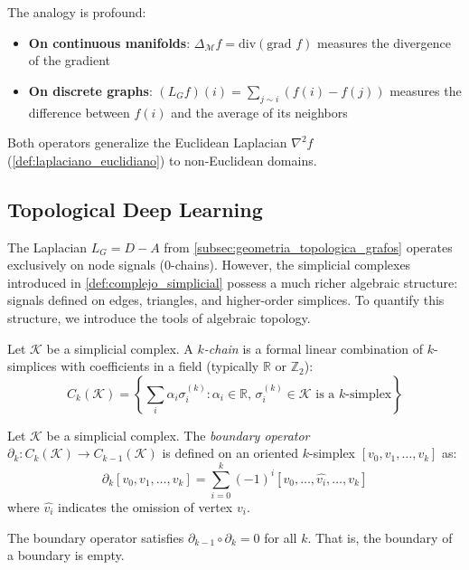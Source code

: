 The analogy is profound:
\begin{itemize}
	\item \textbf{On continuous manifolds}: $\Delta_\mathcal{M} f = \text{div}(\text{grad } f)$ measures the divergence of the gradient
	\item \textbf{On discrete graphs}: $(L_G f)(i) = \sum_{j \sim i} (f(i) - f(j))$ measures the difference between $f(i)$ and the average of its neighbors
\end{itemize}

Both operators generalize the Euclidean Laplacian $\nabla^2 f$ (\autoref{def:laplaciano_euclidiano}) to non-Euclidean domains.

\subsection{Topological Deep Learning}\label{subsec:tdl_grafos}

The Laplacian $L_G = D - A$ from \autoref{subsec:geometria_topologica_grafos} operates exclusively on node signals (0-chains). However, the simplicial complexes introduced in \autoref{def:complejo_simplicial} possess a much richer algebraic structure: signals defined on edges, triangles, and higher-order simplices. To quantify this structure, we introduce the tools of algebraic topology.

\begin{definition}[Chains]\label{def:cadenas_gdl}
	Let $\mathcal{K}$ be a simplicial complex. A \textit{$k$-chain} is a formal linear combination of $k$-simplices with coefficients in a field (typically $\mathbb{R}$ or $\mathbb{Z}_2$):
	\[
		C_k(\mathcal{K}) = \left\{ \sum_{i} \alpha_i \sigma_i^{(k)} : \alpha_i \in \mathbb{R}, \, \sigma_i^{(k)} \in \mathcal{K} \text{ is a } k\text{-simplex} \right\}
	\]
\end{definition}

\begin{definition}\label{def:operador_frontera_gdl}
	Let $\mathcal{K}$ be a simplicial complex. The \textit{boundary operator} $\partial_k: C_k(\mathcal{K}) \to C_{k-1}(\mathcal{K})$ is defined on an oriented $k$-simplex $[v_0, v_1, \ldots, v_k]$ as:
	\[
		\partial_k [v_0, v_1, \ldots, v_k] = \sum_{i=0}^{k} (-1)^i [v_0, \ldots, \widehat{v_i}, \ldots, v_k]
	\]
	where $\widehat{v_i}$ indicates the omission of vertex $v_i$.
\end{definition}

\begin{proposition}\label{prop:frontera_cuadrado_cero}
	The boundary operator satisfies $\partial_{k-1} \circ \partial_k = 0$ for all $k$. That is, the boundary of a boundary is empty.
\end{proposition}

